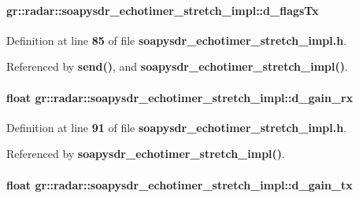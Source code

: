 \paragraph[{d\+\_\+flags\+Tx}]{ gr\+::radar\+::soapysdr\+\_\+echotimer\+\_\+stretch\+\_\+impl\+::d\+\_\+flags\+Tx\hspace{0.3cm}{\ttfamily [private]}}\label{classgr_1_1radar_1_1soapysdr__echotimer__stretch__impl_a96b06a06ab1fb746ef838e5c93e99552}


Definition at line {\bf 85} of file {\bf soapysdr\+\_\+echotimer\+\_\+stretch\+\_\+impl.\+h}.



Referenced by {\bf send()}, and {\bf soapysdr\+\_\+echotimer\+\_\+stretch\+\_\+impl()}.

\paragraph[{d\+\_\+gain\+\_\+rx}]{\setlength{\rightskip}{0pt plus 5cm}float gr\+::radar\+::soapysdr\+\_\+echotimer\+\_\+stretch\+\_\+impl\+::d\+\_\+gain\+\_\+rx\hspace{0.3cm}{\ttfamily [private]}}\label{classgr_1_1radar_1_1soapysdr__echotimer__stretch__impl_a9fccc795593f07fcb412edea0de2decb}


Definition at line {\bf 91} of file {\bf soapysdr\+\_\+echotimer\+\_\+stretch\+\_\+impl.\+h}.



Referenced by {\bf soapysdr\+\_\+echotimer\+\_\+stretch\+\_\+impl()}.

\paragraph[{d\+\_\+gain\+\_\+tx}]{\setlength{\rightskip}{0pt plus 5cm}float gr\+::radar\+::soapysdr\+\_\+echotimer\+\_\+stretch\+\_\+impl\+::d\+\_\+gain\+\_\+tx\hspace{0.3cm}{\ttfamily [private]}}\label{classgr_1_1radar_1_1soapysdr__echotimer__stretch__impl_ae7f0834f6dfe8169d0bfeb3a8d062bfa}


